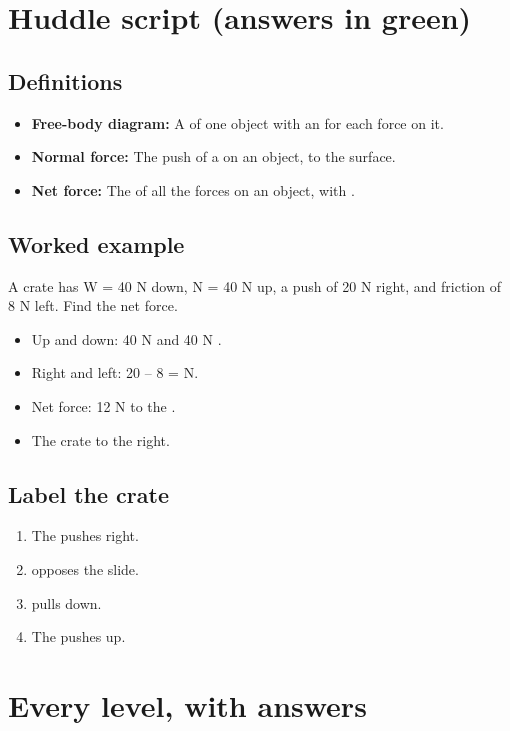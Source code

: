 \documentclass[11pt]{article}
\begin{document}
\section*{Huddle script (answers in green)}
\subsection*{Definitions}\begin{itemize}
\item \textbf{Free-body diagram:} A  of one object with an  for each force on it.
\item \textbf{Normal force:} The push of a  on an object,  to the surface.
\item \textbf{Net force:} The  of all the forces on an object, with .
\end{itemize}
\subsection*{Worked example}
A crate has W = 40 N down, N = 40 N up, a push of 20 N right, and friction of 8 N left. Find the net force.\\
\begin{itemize}
\item Up and down: 40 N and 40 N .
\item Right and left: 20 -- 8 =  N.
\item Net force: 12 N to the .
\item The crate  to the right.
\end{itemize}
\subsection*{Label the crate}
\begin{enumerate}
\item The  pushes right.
\item {} opposes the slide.
\item {} pulls down.
\item The  pushes up.
\end{enumerate}
\section*{Every level, with answers}
\end{document}
